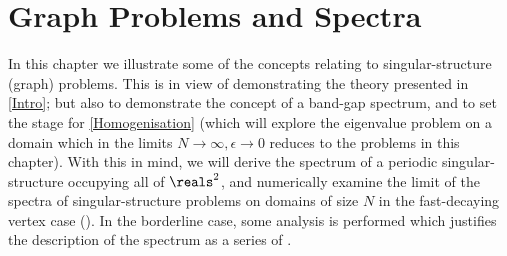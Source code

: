 \chapter{Graph Problems and Spectra} \label{ch:Graphs}
In this chapter we illustrate some of the concepts relating to singular-structure (graph) problems.
This is in view of demonstrating the theory presented in \cref{Intro}; but also to demonstrate the concept of a band-gap spectrum, and to set the stage for \cref{Homogenisation} (which will explore the eigenvalue problem on a domain which in the limits $N\rightarrow\infty, \epsilon\rightarrow0$ reduces to the problems in this chapter).
With this in mind, we will derive the spectrum of a periodic singular-structure occupying all of $\reals^{2}$, and numerically examine the limit of the spectra of singular-structure problems on domains of size $N$ in the fast-decaying vertex case ().
In the borderline case, some analysis is performed which justifies the description of the spectrum as a series of . \newline

